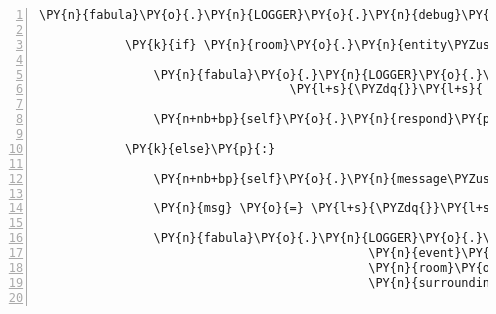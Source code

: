 \begin{Verbatim}[commandchars=\\\{\},numbers=left,firstnumber=1,stepnumber=1]
            \PY{n}{fabula}\PY{o}{.}\PY{n}{LOGGER}\PY{o}{.}\PY{n}{debug}\PY{p}{(}\PY{l+s}{\PYZdq{}}\PY{l+s}{target }\PY{l+s}{\PYZsq{}}\PY{l+s}{\PYZob{}\PYZcb{}}\PY{l+s}{\PYZsq{}}\PY{l+s}{ is an entity identifier}\PY{l+s}{\PYZdq{}}\PY{o}{.}\PY{n}{format}\PY{p}{(}\PY{n}{event}\PY{o}{.}\PY{n}{target\PYZus{}identifier}\PY{p}{)}\PY{p}{)}

            \PY{k}{if} \PY{n}{room}\PY{o}{.}\PY{n}{entity\PYZus{}locations}\PY{p}{[}\PY{n}{event}\PY{o}{.}\PY{n}{target\PYZus{}identifier}\PY{p}{]} \PY{o+ow}{in} \PY{n}{surrounding\PYZus{}positions}\PY{p}{:}

                \PY{n}{fabula}\PY{o}{.}\PY{n}{LOGGER}\PY{o}{.}\PY{n}{info}\PY{p}{(}\PY{l+s}{\PYZdq{}}\PY{l+s}{\PYZsq{}}\PY{l+s}{\PYZob{}\PYZcb{}}\PY{l+s}{\PYZsq{}}\PY{l+s}{ dropped on Entity }\PY{l+s}{\PYZsq{}}\PY{l+s}{\PYZob{}\PYZcb{}}\PY{l+s}{\PYZsq{}}\PY{l+s}{,}\PY{l+s}{\PYZdq{}}
                                   \PY{l+s}{\PYZdq{}}\PY{l+s}{ forwarding to respond()}\PY{l+s}{\PYZdq{}}\PY{o}{.}\PY{n}{format}\PY{p}{(}\PY{n}{event}\PY{o}{.}\PY{n}{item\PYZus{}identifier}\PY{p}{,}
                                                                     \PY{n}{event}\PY{o}{.}\PY{n}{target\PYZus{}identifier}\PY{p}{)}\PY{p}{)}
                \PY{n+nb+bp}{self}\PY{o}{.}\PY{n}{respond}\PY{p}{(}\PY{n}{event}\PY{p}{)}

            \PY{k}{else}\PY{p}{:}

                \PY{n+nb+bp}{self}\PY{o}{.}\PY{n}{message\PYZus{}for\PYZus{}host}\PY{o}{.}\PY{n}{event\PYZus{}list}\PY{o}{.}\PY{n}{append}\PY{p}{(}\PY{n}{fabula}\PY{o}{.}\PY{n}{AttemptFailedEvent}\PY{p}{(}\PY{n}{event}\PY{o}{.}\PY{n}{identifier}\PY{p}{)}\PY{p}{)}

                \PY{n}{msg} \PY{o}{=} \PY{l+s}{\PYZdq{}}\PY{l+s}{AttemptFailed: drop of }\PY{l+s}{\PYZsq{}}\PY{l+s}{\PYZob{}\PYZcb{}}\PY{l+s}{\PYZsq{}}\PY{l+s}{ on }\PY{l+s}{\PYZsq{}}\PY{l+s}{\PYZob{}\PYZcb{}}\PY{l+s}{\PYZsq{}}\PY{l+s}{ at \PYZob{}\PYZcb{} not next to player: \PYZob{}\PYZcb{}, nor in rack}\PY{l+s}{\PYZdq{}}

                \PY{n}{fabula}\PY{o}{.}\PY{n}{LOGGER}\PY{o}{.}\PY{n}{info}\PY{p}{(}\PY{n}{msg}\PY{o}{.}\PY{n}{format}\PY{p}{(}\PY{n}{event}\PY{o}{.}\PY{n}{item\PYZus{}identifier}\PY{p}{,}
                                              \PY{n}{event}\PY{o}{.}\PY{n}{target\PYZus{}identifier}\PY{p}{,}
                                              \PY{n}{room}\PY{o}{.}\PY{n}{entity\PYZus{}locations}\PY{p}{[}\PY{n}{event}\PY{o}{.}\PY{n}{target\PYZus{}identifier}\PY{p}{]}\PY{p}{,}
                                              \PY{n}{surrounding\PYZus{}positions}\PY{p}{)}\PY{p}{)}


\end{Verbatim}
